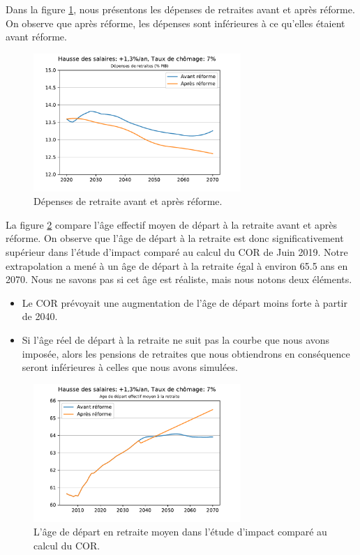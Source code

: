 \documentclass[10pt]{article}
\begin{document}
Dans la figure \ref{fig-depenses-avant-apres-reforme}, nous présentons les 
dépenses de retraites avant et après réforme. 
On observe que après réforme, les dépenses sont inférieures à ce qu'elles 
étaient avant réforme. 

\begin{figure}
\begin{center}
\includegraphics[width=0.7\textwidth]{Simulation-vs-avant-reforme-Depenses.pdf}
\end{center}
\caption{Dépenses de retraite avant et après réforme.}
\label{fig-depenses-avant-apres-reforme}
\end{figure}

La figure \ref{fig-simulation-A-vs-COR} compare l'âge effectif moyen 
de départ à la retraite avant et après réforme. 
On observe que l'âge de départ à la retraite est donc 
significativement supérieur dans l'étude d'impact comparé au calcul du COR de Juin 2019. 
Notre extrapolation a mené à un âge de départ à la retraite égal à 
environ 65.5 ans en 2070. 
Nous ne savons pas si cet âge est réaliste, mais nous notons deux éléments. 
\begin{itemize}
\item Le COR prévoyait une augmentation de l'âge de départ moins 
forte à partir de 2040. 
\item Si l'âge réel de départ à la retraite ne suit pas la courbe 
que nous avons imposée, alors les pensions de retraites que nous 
obtiendrons en conséquence seront inférieures à celles que nous avons 
simulées. 
\end{itemize}

\begin{figure}
\begin{center}
\includegraphics[width=0.7\textwidth]{Simulation-vs-avant-reforme-Age.pdf}
\end{center}
\caption{L'âge de départ en retraite moyen dans l'étude d'impact comparé 
au calcul du COR.}
\label{fig-simulation-A-vs-COR}
\end{figure}
\end{document}
